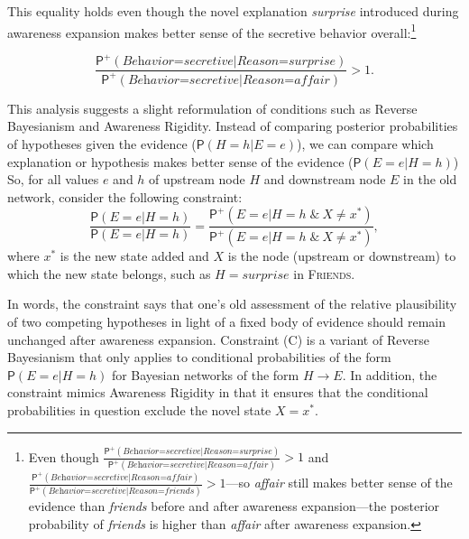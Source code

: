 \documentclass[
  11pt,
  dvipsnames,enabledeprecatedfontcommands]{scrartcl}
\newcommand{\pr}[1]{\ensuremath{\mathsf{P}(#1)}}
\newcommand{\ppr}[2]{\ensuremath{\mathsf{P}^{#1}(#2)}}
\begin{document}
\noindent This equality holds even though the novel explanation
\textit{surprise} introduced during awareness expansion makes better
sense of the secretive behavior overall:\footnote{Even though
  \(\frac{\ppr{+}{\textit{Behavior=secretive} \vert \textit{Reason=surprise}}}{\ppr{+}{\textit{Behavior=secretive} \vert \textit{Reason=affair}}}>1\)
  and
  \(\frac{\ppr{+}{\textit{Behavior=secretive} \vert \textit{Reason=affair}}}{\ppr{+}{\textit{Behavior=secretive} \vert \textit{Reason=friends}}}>1\)---so
  \textit{affair} still makes better sense of the evidence than
  \textit{friends} before and after awareness expansion---the posterior
  probability of \textit{friends} is higher than \textit{affair} after
  awareness expansion.}

\[\frac{\ppr{+}{\textit{Behavior=secretive} \vert \textit{Reason=surprise}}}{\ppr{+}{\textit{Behavior=secretive} \vert \textit{Reason=affair}}}>1. \]

This analysis suggests a slight reformulation of conditions such as
Reverse Bayesianism and Awareness Rigidity. Instead of comparing
posterior probabilities of hypotheses given the evidence
(\(\pr{H=h \vert E=e}\)), we can compare which explanation or hypothesis
makes better sense of the evidence (\(\pr{E=e \vert H=h}\)) So, for all
values \(e\) and \(h\) of upstream node \(H\) and downstream node \(E\)
in the old network, consider the following constraint:
\[\frac{\pr{E=e \vert H=h}}{\pr{E=e \vert H=h}} = \frac{\ppr{+}{E=e \vert H=h  \; \& \: X\neq x^*}}{\ppr{+}{E=e \vert H=h  \; \& \: X\neq x^*}}, \tag{C}\]
where \(x^*\) is the new state added and \(X\) is the node (upstream or
downstream) to which the new state belongs, such as
\(H=\textit{surprise}\) in \textsc{Friends}.

In words, the constraint says that one's old assessment of the relative
plausibility of two competing hypotheses in light of a fixed body of
evidence should remain unchanged after awareness expansion. Constraint
(C) is a variant of Reverse Bayesianism that only applies to conditional
probabilities of the form \(\pr{E=e \vert H=h}\) for Bayesian networks
of the form \(H \rightarrow E\). In addition, the constraint mimics
Awareness Rigidity in that it ensures that the conditional probabilities
in question exclude the novel state \(X=x^*\).
\end{document}

